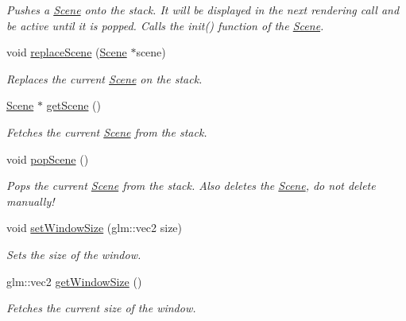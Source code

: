 \begin{DoxyCompactItemize}
\begin{DoxyCompactList}\small\item\em Pushes a \mbox{\hyperlink{classsage_1_1Scene}{Scene}} onto the stack. It will be displayed in the next rendering call and be active until it is popped. Calls the init() function of the \mbox{\hyperlink{classsage_1_1Scene}{Scene}}. \end{DoxyCompactList}\item 
void \mbox{\hyperlink{classsage_1_1Application_a49f5ce7574cf4f3053c4213d3177c76c}{replace\+Scene}} (\mbox{\hyperlink{classsage_1_1Scene}{Scene}} $\ast$scene)
\begin{DoxyCompactList}\small\item\em Replaces the current \mbox{\hyperlink{classsage_1_1Scene}{Scene}} on the stack. \end{DoxyCompactList}\item 
\mbox{\hyperlink{classsage_1_1Scene}{Scene}} $\ast$ \mbox{\hyperlink{classsage_1_1Application_a4eaac489d4247bd184e17fa0aa6c858c}{get\+Scene}} ()
\begin{DoxyCompactList}\small\item\em Fetches the current \mbox{\hyperlink{classsage_1_1Scene}{Scene}} from the stack. \end{DoxyCompactList}\item 
void \mbox{\hyperlink{classsage_1_1Application_a47b5bec61b3d93cbb4998b42d0d2ea47}{pop\+Scene}} ()
\begin{DoxyCompactList}\small\item\em Pops the current \mbox{\hyperlink{classsage_1_1Scene}{Scene}} from the stack. Also deletes the \mbox{\hyperlink{classsage_1_1Scene}{Scene}}, do not delete manually! \end{DoxyCompactList}\item 
void \mbox{\hyperlink{classsage_1_1Application_a991df90e69398b7fe8eeb0fa2df3d92e}{set\+Window\+Size}} (glm\+::vec2 size)
\begin{DoxyCompactList}\small\item\em Sets the size of the window. \end{DoxyCompactList}\item 
glm\+::vec2 \mbox{\hyperlink{classsage_1_1Application_ac0fa1750ee8dcacc37cc9eaed72f12f9}{get\+Window\+Size}} ()
\begin{DoxyCompactList}\small\item\em Fetches the current size of the window. \end{DoxyCompactList}\item 

\end{DoxyCompactItemize}
